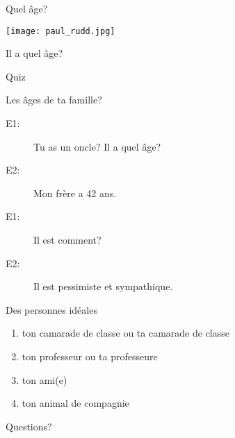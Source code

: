 \documentclass{beamer}
\begin{document}
  \begin{frame}{Quel âge?}
    \begin{center}
      \texttt{[image: paul\_rudd.jpg]}

      Il a quel âge? \underline{}
    \end{center}
  \end{frame}

  \begin{frame}{}
    \begin{center}
      \Large Quiz
    \end{center}
  \end{frame}

  \begin{frame}{Les âges de ta famille?}
    \begin{description}
      \item[E1:] Tu as un oncle? Il a quel âge?
      \item[E2:] Mon frère a 42 ans.
      \item[E1:] Il est comment?
      \item[E2:] Il est pessimiste et sympathique.
    \end{description}
  \end{frame}

  \begin{frame}{Des personnes idéales}
    \begin{enumerate}
      \item ton camarade de classe ou ta camarade de classe
      \item ton professeur ou ta professeure
      \item ton ami(e)
      \item ton animal de compagnie
    \end{enumerate}
  \end{frame}

  \begin{frame}{}
    \begin{center}
      \Large Questions?
    \end{center}
  \end{frame}
\end{document}
